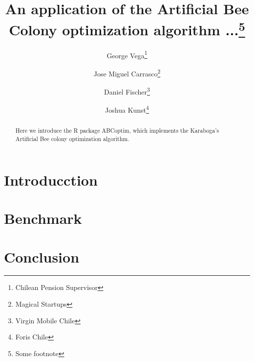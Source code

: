 \documentclass{article}
\title{An application of the Artificial Bee Colony optimization algorithm ...\footnote{Some footnote}}
\author{
George Vega\thanks{Chilean Pension Supervisor} \and
Jose Miguel Carrasco\thanks{Magical Startups} \and
Daniel Fischer\thanks{Virgin Mobile Chile} \and
Joshua Kunst\thanks{Foris Chile}
}
\begin{document}
\maketitle

\begin{abstract}
Here we introduce the R package ABCoptim, which implements the Karaboga's 
Artificial Bee colony optimization algorithm.
\end{abstract}

\section{Introducction}


\section{Benchmark}



\section{Conclusion}
\end{document}
